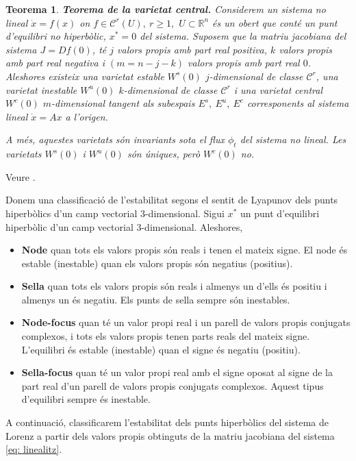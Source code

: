 \documentclass[11pt,a4paper,openright,oneside]{article}
\numberwithin{equation}{section}
\newtheorem{teo}{Teorema}[section]
\theoremstyle{definition}
\begin{document}
\begin{teo} \textbf{Teorema de la varietat central.}
    Considerem un sistema no lineal $\dot{x}=f(x)$ on $f\in \mathcal{C}^r(U), \ r\geq1,$ $U\subset \mathbb{R}^n$ és un obert que conté un punt d'equilibri no hiperbòlic, $x^*=0$ del sistema. Suposem que la matriu jacobiana del sistema $J=Df(0)$, té $j$ valors propis amb part real positiva, $k$ valors propis amb part real negativa i $(m=n-j-k)$ valors propis amb part real $0$. Aleshores existeix una varietat estable $W^s(0)$ $j$-dimensional de classe $\mathcal{C}^r$, una varietat inestable $W^u(0)$ $k$-dimensional de classe $\mathcal{C}^r$ i una varietat central $W^c(0)$ $m$-dimensional tangent als subespais $E^s, \ E^u, \ E^c$ corresponents al sistema lineal $\dot{x}=Ax$ a l'origen. 

    A més, aquestes varietats són invariants sota el flux $\phi_t$ del sistema no lineal. Les varietats $W^s(0)$ i $W^u(0)$ són úniques, però $W^c(0)$ no.
\end{teo}

\proof Veure \cite{manifolds}.

Donem una classificació de l'estabilitat segons el sentit de Lyapunov dels punts hiperbòlics d'un camp vectorial $3$-dimensional. Sigui $x^{*}$ un punt d'equilibri hiperbòlic d'un camp vectorial $3$-dimensional. Aleshores,
    \begin{itemize}
        \item \textbf{Node} quan tots els valors propis són reals i tenen el mateix signe. El node és estable (inestable) quan els valors propis són negatius (positius).

        \item \textbf{Sella} quan tots els valors propis són reals i almenys un d'ells és positiu i almenys un és negatiu. Els punts de sella sempre són inestables.

        \item \textbf{Node-focus} quan té un valor propi real i un parell de valors propis conjugats complexos, i tots els valors propis tenen parts reals del mateix signe. L'equilibri és estable (inestable) quan el signe és negatiu (positiu).

        \item \textbf{Sella-focus} quan té un valor propi real amb el signe oposat al signe de la part real d'un parell de valors propis conjugats complexos. Aquest tipus d'equilibri sempre és inestable.
    \end{itemize}   

A continuació, classificarem l'estabilitat dels punts hiperbòlics del sistema de Lorenz a partir dels valors propis obtinguts de la matriu jacobiana del sistema \eqref{eq: linealitz}.
\end{document}
